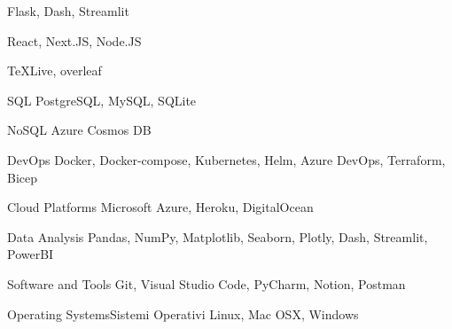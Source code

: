 

\begin{cvskills}
  {Flask, Dash, Streamlit}

  {React, Next.JS, Node.JS}

  {TeXLive, overleaf}

  {}

  {}

  {}

  {}

\end{cvskills}


\begin{cvskills}
  \cvskill
  {SQL}
  {PostgreSQL, MySQL, SQLite}

  \cvskill
  {NoSQL}
  {Azure Cosmos DB}

\end{cvskills}


\begin{cvskills}

\end{cvskills}


\begin{cvskills}

\cvskill
{DevOps} %
{Docker, Docker-compose, Kubernetes, Helm, Azure DevOps, Terraform, Bicep} %

\cvskill
{Cloud Platforms} %
{Microsoft Azure, Heroku, DigitalOcean} %

\end{cvskills}





\begin{cvskills}
\cvskill
{Data Analysis} %
{Pandas, NumPy, Matplotlib, Seaborn, Plotly, Dash, Streamlit, PowerBI} %


\cvskill
{Software and Tools} %
{Git, Visual Studio Code, PyCharm, Notion, Postman} %


\cvskill
{\ifenglish Operating Systems\else Sistemi Operativi\fi} %
{Linux, Mac OSX, Windows} %
\end{cvskills}